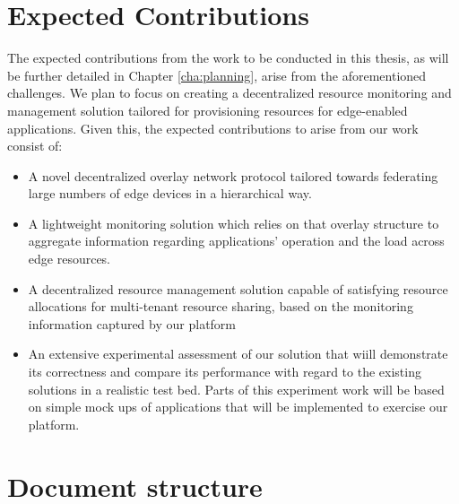 \section{Expected Contributions}

The expected contributions from the work to be conducted in this thesis, as will be further detailed in Chapter \ref{cha:planning}, arise from the aforementioned challenges. We plan to focus on creating a decentralized resource monitoring and management solution tailored for provisioning resources for edge-enabled applications. Given this, the expected contributions to arise from our work consist of: 

\begin{itemize}

    \item A novel decentralized overlay network protocol tailored towards federating large numbers of edge devices in a hierarchical way.
    
    \item A lightweight monitoring solution which relies on that overlay structure to aggregate information regarding applications’ operation and the load across edge resources.
    
    \item A decentralized resource management solution capable of satisfying resource allocations for multi-tenant resource sharing, based on the monitoring information captured by our platform
    
    \item An extensive experimental assessment of our solution that wiill demonstrate its correctness and compare its performance with regard to the existing solutions in a realistic test bed. Parts of this experiment work will be based on simple mock ups of applications that will be implemented to exercise our platform.



    
\end{itemize}

\section{Document structure}

